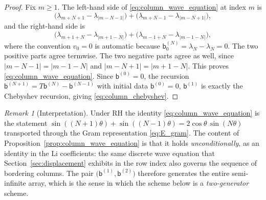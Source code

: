 \documentclass[preprint,12pt]{elsarticle}
\numberwithin{equation}{section}
\theoremstyle{plain}
\theoremstyle{definition}
\theoremstyle{remark}
\newtheorem{remark}[theorem]{Remark}
\newcommand{\RH}{\mathrm{RH}}
\begin{document}
\begin{proof}
Fix $m\ge1$.  The left-hand side of \eqref{eq:column_wave_equation} at index $m$ is
\begin{equation}
 \bigl(\lambda_{m+N+1}-\lambda_{|m-N-1|}\bigr)
 +\bigl(\lambda_{m+N-1}-\lambda_{|m-N+1|}\bigr),
\end{equation}
and the right-hand side is
\begin{equation}
 \bigl(\lambda_{m+1+N}-\lambda_{|m+1-N|}\bigr)
 +\bigl(\lambda_{m-1+N}-\lambda_{|m-1-N|}\bigr),
\end{equation}
where the convention $v_0=0$ is automatic because $\mathsf b^{(N)}_0=\lambda_N-\lambda_N=0$.
The two positive parts agree termwise.  The two negative parts agree as well, since
$|m-N-1|=|m-1-N|$ and $|m-N+1|=|m+1-N|$.  This proves
\eqref{eq:column_wave_equation}.  Since $\mathsf b^{(0)}=0$, the recursion
$\mathsf b^{(N+1)}=T\mathsf b^{(N)}-\mathsf b^{(N-1)}$ with initial data
$\mathsf b^{(0)}=0$, $\mathsf b^{(1)}$ is exactly the Chebyshev recursion, giving
\eqref{eq:column_chebyshev}.
\end{proof}

\begin{remark}[Interpretation]
\label{rem:column_wave_meaning}
Under $\RH$ the identity \eqref{eq:column_wave_equation} is the statement
$\sin((N+1)\theta)+\sin((N-1)\theta)=2\cos\theta\,\sin(N\theta)$ transported through the
Gram representation \eqref{eq:E_gram}.  The content of
Proposition~\ref{prop:column_wave_equation} is that it holds \emph{unconditionally}, as an
identity in the Li coefficients: the same discrete wave equation that
Section~\ref{sec:displacement} exhibits in the row index also governs the sequence of
bordering columns.  The pair $\bigl(\mathsf b^{(1)},\mathsf b^{(2)}\bigr)$ therefore
generates the entire semi-infinite array, which is the sense in which the scheme below is
a \emph{two-generator} scheme.
\end{remark}
\end{document}
